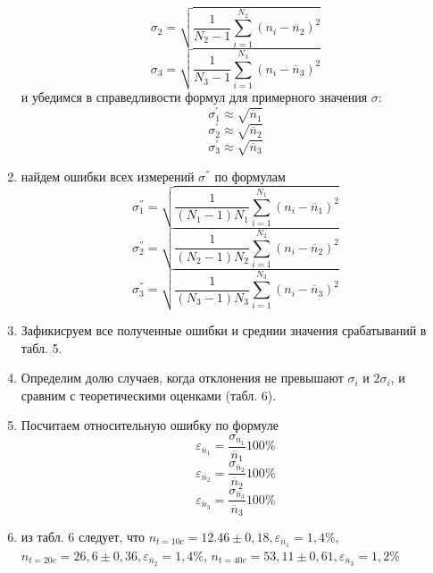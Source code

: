 \documentclass[a4paper, 12pt]{article}
\begin{document}
\begin{enumerate}
\[ \]
 \[ \sigma_2 = \sqrt{\dfrac{1}{N_2 - 1} \sum_{i = 1}^{N_2} {(n_i - \overline{n}_2)^2} }
 \]
 \[ \sigma_3 = \sqrt{\dfrac{1}{N_3 - 1} \sum_{i = 1}^{N_3} {(n_i - \overline{n}_3)^2} }
 \]
и убедимся в справедливости формул для примерного значения \textbf{$\sigma$}:
 \[\sigma_1^{'} \approx\sqrt{\overline{n}_1} \]
 \[\sigma_2^{'} \approx\sqrt{\overline{n}_2} \]
 \[\sigma_3^{'} \approx\sqrt{\overline{n}_3} \]
 \item найдем ошибки всех измерений \textbf{$\sigma^{''}$} по формулам
 \[ \sigma_1^{''} = \sqrt{\dfrac{1}{(N_1 - 1)N_1} \sum_{i = 1}^{N_1} {(n_i - \overline{n}_1)^2} }
 \]
 \[ \sigma_2^{''} = \sqrt{\dfrac{1}{(N_2 - 1)N_2} \sum_{i = 1}^{N_2} {(n_i - \overline{n}_2)^2} }
 \]
 \[ \sigma_3^{''} = \sqrt{\dfrac{1}{(N_3 - 1)N_3} \sum_{i = 1}^{N_3} {(n_i - \overline{n}_3)^2} }
 \]
\item Зафикисруем все полученные ошибки и среднии значения срабатываний в табл. 5.
\item Определим долю случаев, когда отклонения не превышают $\sigma_i$ и $2\sigma_i$, и сравним с теоретическими оценками (табл. 6).
\item Посчитаем относительную ошибку по формуле
\[ \varepsilon_{\overline{n}_1} = \dfrac{\sigma_{\overline{n}_1}}{\overline{n}_1} 100 \% \]
\[ \varepsilon_{\overline{n}_2} = \dfrac{\sigma_{\overline{n}_2}}{\overline{n}_2} 100 \% \]
\[ \varepsilon_{\overline{n}_3} = \dfrac{\sigma_{\overline{n}_3}}{\overline{n}_3} 100 \% \]
\item из табл. 6 следует, что $n_{t=10 c} = 12.46 \pm 0,18, \varepsilon_{\overline{n}_1} = 1,4 \%$, $n_{t=20 c} = 26,6 \pm 0,36, \varepsilon_{\overline{n}_2} = 1,4 \%$, $n_{t=40 c} = 53,11 \pm 0,61, \varepsilon_{\overline{n}_3} = 1,2 \%$
\end{enumerate}

\\
\end{document}
